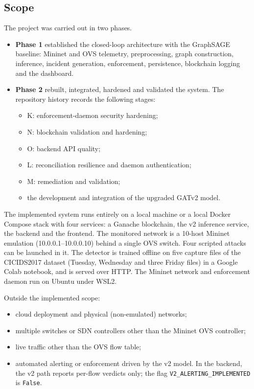\documentclass[12pt,a4paper]{report}
\begin{document}
\subsection{Scope}
The project was carried out in two phases.
\begin{itemize}
    \item \textbf{Phase 1} established the closed-loop architecture with the GraphSAGE baseline: Mininet and OVS telemetry, preprocessing, graph construction, inference, incident generation, enforcement, persistence, blockchain logging and the dashboard.
    \item \textbf{Phase 2} rebuilt, integrated, hardened and validated the system. The repository history records the following stages:
    \begin{itemize}
        \item K: enforcement-daemon security hardening;
        \item N: blockchain validation and hardening;
        \item O: backend API quality;
        \item L: reconciliation resilience and daemon authentication;
        \item M: remediation and validation;
        \item the development and integration of the upgraded GATv2 model.
    \end{itemize}
\end{itemize}
\par
The implemented system runs entirely on a local machine or a local Docker Compose stack with four services: a Ganache blockchain, the v2 inference service, the backend and the frontend. The monitored network is a 10-host Mininet emulation (10.0.0.1--10.0.0.10) behind a single OVS switch. Four scripted attacks can be launched in it. The detector is trained offline on five capture files of the CICIDS2017 dataset (Tuesday, Wednesday and three Friday files) in a Google Colab notebook, and is served over HTTP. The Mininet network and enforcement daemon run on Ubuntu under WSL2.
\par
Outside the implemented scope:
\begin{itemize}
    \item cloud deployment and physical (non-emulated) networks;
    \item multiple switches or SDN controllers other than the Mininet OVS controller;
    \item live traffic other than the OVS flow table;
    \item automated alerting or enforcement driven by the v2 model. In the backend, the v2 path reports per-flow verdicts only; the flag \texttt{V2\_ALERTING\_IMPLEMENTED} is \texttt{False}.
\end{itemize}
\end{document}
